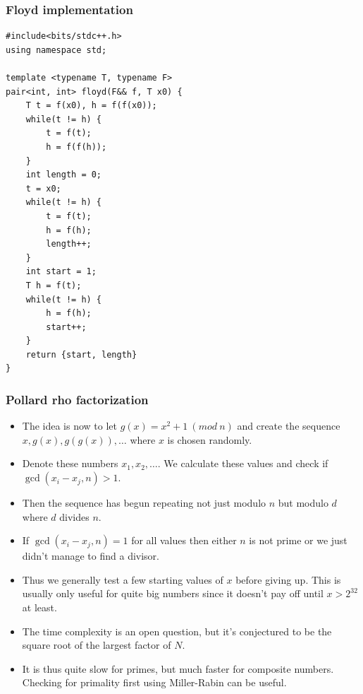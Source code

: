 \documentclass{beamer}
\begin{document}
\begin{frame}
\frametitle{Floyd implementation}

\begin{tiny}
\begin{verbatim}
#include<bits/stdc++.h>
using namespace std;

template <typename T, typename F>
pair<int, int> floyd(F&& f, T x0) {
    T t = f(x0), h = f(f(x0));
    while(t != h) {
        t = f(t); 
        h = f(f(h));
    }
    int length = 0;
    t = x0;
    while(t != h) {
        t = f(t);
        h = f(h);
        length++;
    }
    int start = 1;
    T h = f(t);
    while(t != h) {
        h = f(h);
        start++;
    }
    return {start, length}
}
\end{verbatim}
\end{tiny}

\end{frame}

\begin{frame}[plain]
\frametitle{Pollard rho factorization}

\begin{itemize}

\item<1-> The idea is now to let $g(x) = x^2 + 1 \ (mod \ n)$ and create the sequence $x, g(x), g(g(x)), \dots$ where $x$ is chosen randomly.
\item<2-> Denote these numbers $x_1, x_2, \dots$. We calculate these values and check if $\operatorname{gcd}(x_i - x_j, n) > 1$.
\item<3-> Then the sequence has begun repeating not just modulo $n$ but modulo $d$ where $d$ divides $n$.
\item<4-> If $\operatorname{gcd}(x_i - x_j, n) = 1$ for all values then either $n$ is not prime or we just didn't manage to find a divisor.
\item<5-> Thus we generally test a few starting values of $x$ before giving up. This is usually only useful for quite big numbers since it doesn't pay off until $x > 2^{32}$ at least.
\item<6-> The time complexity is an open question, but it's conjectured to be the square root of the largest factor of $N$.
\item<7-> It is thus quite slow for primes, but much faster for composite numbers. Checking for primality first using Miller-Rabin can be useful.

\end{itemize}

\end{frame}
\end{document}
